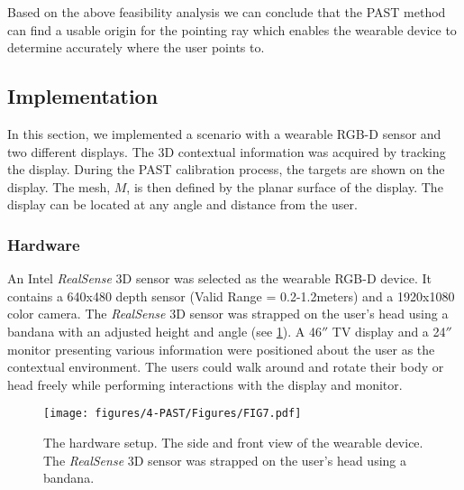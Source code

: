 Based on the above feasibility analysis we can conclude that the PAST method can find a usable origin for the pointing ray which enables the wearable device to determine accurately where the user points to.
\subsection{Implementation}
In this section, we implemented a scenario with a wearable RGB-D sensor and two different displays. The 3D contextual information was acquired by tracking the display. During the PAST calibration process, the targets are shown on the display. The mesh, $M$, is then defined by the planar surface of the display. The display can be located at any angle and distance from the user.

\subsubsection{Hardware}
An Intel \textit{RealSense} 3D sensor  was selected as the wearable RGB-D device. It contains a 640x480 depth sensor (Valid Range = 0.2-1.2meters) and a 1920x1080 color camera. 
The \textit{RealSense} 3D sensor was strapped on the user{\rq}s head using a bandana with an adjusted height and angle (see \figurename{ \ref{fig:hardWare}}). 
A 46$''$ TV display and a 24$''$ monitor presenting various information were positioned about the user as the contextual environment. 
The users could walk around and rotate their body or head freely while performing interactions with the display and monitor. 
\begin{figure}
	\centering
	\texttt{[image: figures/4-PAST/Figures/FIG7.pdf]}
	\caption{The hardware setup. The side and front view of the wearable device. The \textit{RealSense} 3D sensor was strapped on the user{\rq}s head using a bandana.}
	\label{fig:hardWare}
\end{figure}
